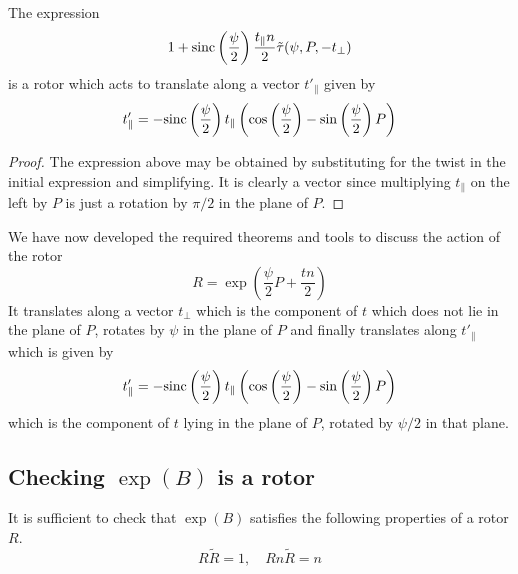 \begin{lemma}
The expression
\[
 1 + \mathrm{sinc}\left(\frac{\psi}{2}\right)\frac{t_\parallel n}{2} \tilde{\tau}(\psi, P, - t_\perp)
\]
is a rotor which acts to translate along a vector $t'_\parallel$ given by
\[
t'_\parallel = - \mathrm{sinc}\left(\frac{\psi}{2}\right)
t_\parallel
\left(
\cos\left(\frac{\psi}{2}\right) -
\sin\left(\frac{\psi}{2}\right) P 
\right)
\]
\end{lemma}
\begin{proof}
The expression above may be obtained by substituting for the twist in the initial expression and simplifying. 
It is clearly a vector since multiplying $t_\parallel$ on the left by $P$ is just a rotation by $\pi / 2$ in the plane
of $P$.
\end{proof}

We have now developed the required theorems and tools to discuss the
action of the rotor
\[
R = \exp\left(
\frac{\psi}{2} P + \frac{tn}{2}
\right)
\]
It translates along a vector $t_\perp$ which is the component of $t$ which does not lie in the
plane of $P$, rotates by $\psi$ in the plane of $P$ and finally translates along 
$t'_\parallel$ which is given by
\[
t'_\parallel =- \mathrm{sinc}\left(\frac{\psi}{2}\right)
t_\parallel
\left(
\cos\left(\frac{\psi}{2}\right) -
\sin\left(\frac{\psi}{2}\right) P 
\right)
\]
which is the component of $t$ lying in the
plane of $P$, rotated by $\psi/2$ in that plane.

\subsection{Checking $\exp(B)$ is a rotor}

It is sufficient to check that $\exp(B)$ satisfies the following
properties of a rotor $R$. %
\[
R\tilde{R} = 1, \quad Rn\tilde{R} = n
\]

